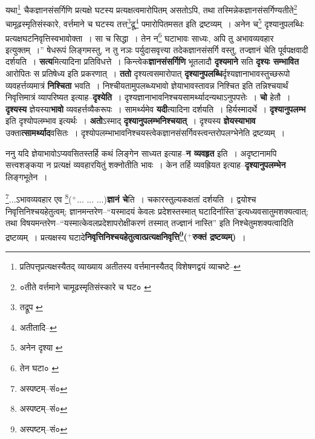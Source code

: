 \documentclass[article,12pt,a4paper]{memoir}
\newcommand{\add}[1]{($^{+}$#1)}
\begin{document}
	यथा\footnote{प्रतिपत्तृप्रत्यक्षस्यैतद् व्याख्याय अतीतस्य वर्त्तमानस्यैतद् विशेषणद्वयं व्याचष्टे--\cite{dp-msD-n}} चैकज्ञानसंसर्गिणि प्रत्यक्षे घटस्य प्रत्यक्षत्वमारोपितम् असतोऽपि, तथा तस्मिन्नेकज्ञानसंसर्गिण्यतीते\footnote{०तीते वर्त्तमाने चामूढस्मृतिसंस्कारे च घट० \cite{dp-msA} \cite{dp-msB} \cite{dp-msC} \cite{dp-msD} \cite{dp-edP} \cite{dp-edH} \cite{dp-edN}} चामूढस्मृतिसंस्कारे, वर्त्तमाने च घटस्य तत्त\footnote{तद्रूप \cite{dp-msA} \cite{dp-msB} \cite{dp-edP} \cite{dp-edH} \cite{dp-edE} \cite{dp-edN}}द्रू\footnote{अतीतादि--\cite{dp-msD-n}} पमारोपितमसत इति द्रष्टव्यम् । अनेन च\footnote{अनेन दृश्या \cite{dp-msA} \cite{dp-msB} \cite{dp-edP} \cite{dp-edH} \cite{dp-edE} \cite{dp-edN}} दृश्यानुपलब्धिः प्रत्यक्षघटनिवृत्तिस्वभावोक्ता । सा च सिद्धा । तेन न\footnote{तेन घटा० \cite{dp-msB}} घटाभावः साध्यः, अपि तु अभावव्यवहार इत्युक्तम् ।” षेधरूपं लिङ्गमस्तु, न तु नञः पर्युदासवृत्त्या तदेकज्ञानसंसर्गि वस्तु, तज्ज्ञानं चेति पूर्वपक्षवादी दर्शयति । \textbf{सत्य}मित्यादिना प्रतिविधत्ते । किन्त्वेक\textbf{ज्ञानसंसर्गिणि} भूतलादौ \textbf{दृश्यमाने} सति \textbf{दृश्यः सम्भावित} आरोपितः स प्रतिषेध्य इति प्रकरणात् । \textbf{ततो} दृश्यत्वसमारोपात् \textbf{दृश्यानुपलब्धि}र्दृश्यज्ञानाभावस्तुच्छरूपो व्यवहर्त्तव्यमात्रं \textbf{निश्चिता} भवति । निश्चीयतामुपलब्ध्यभावो ज्ञेयाभावस्तावन्न निश्चित इति तन्निश्चयार्थं निवृत्तिमात्रं व्यापरिष्यत इत्याह--\textbf{दृश्येति} । दृश्यज्ञानाभावनिश्चयसामर्थ्यादन्यथाऽनु\leavevmode{}पपत्तेः । \textbf{चो} हेतौ । \textbf{दृश्यस्य} ज्ञेयस्या\textbf{भावो} व्यवहर्त्तव्यैकरूपः । सामर्थ्यमेव \textbf{यदी}त्यादिना दर्शयति । हिर्यस्मादर्थे । \textbf{दृश्यानुपलम्भ} इति दृश्योपलम्भाव इत्यर्थः । \textbf{अतो}ऽस्माद् \textbf{दृश्यानुपलम्भनिश्चयात्} । दृश्यस्य \textbf{ज्ञेयस्याभाव} उक्ता\textbf{त्सामर्थ्याद}वसितः । दृश्योपलम्भाभावनिश्चयस्त्वेकज्ञानसंसर्गिवस्त्वन्तरोपलग्भेनेति द्रष्टव्यम् ।
	\pend
      

	  \pstart ननु यदि ज्ञेयाभावोऽप्यवसितस्तर्हि कथं लिङ्गेन साध्यत इत्याह--\textbf{न व्यवहृत} इति । अदृष्टानामपि सत्त्वशङ्कया न प्रत्यक्षं व्यवहारयितुं शक्नोतीति भावः । केन तर्हि व्यवह्रियत इत्याह--\textbf{दृश्यानुपलम्भेन} लिङ्गभूतेन ।
	\pend
      

	  \pstart \footnote{अस्पष्टम्--सं०}...ऽभावव्यवहार एव \footnote{अस्पष्टम्--सं०}\add{... ... ...}\textbf{ज्ञानं चे}ति । चकारस्तुल्यकक्षतां दर्शयति । द्वयोश्च निवृत्तिनिश्चयहेतुत्वम्; ज्ञानमन्तरेण--“यस्मादयं केवलः प्रदेशस्तस्मात् घटादिर्नास्ति”इत्यध्यवसातुमशक्यत्वात्; तथा विषयमन्तरेण--“यस्मात्केवलप्रदेशापरोक्षीकरणं तस्मात् तज्ज्ञानं नास्ति” इति निश्चेतुमशक्यत्वादिति द्रष्टव्यम् । प्रत्यक्षस्य घटादे\textbf{निवृत्तिनिश्चयहेतुत्वात्प्रत्यक्षनिवृत्ति\footnote{अस्पष्टम्--सं०}\add{रुक्तं द्रष्टव्यम्}} ।
	\pend
      
\end{document}
